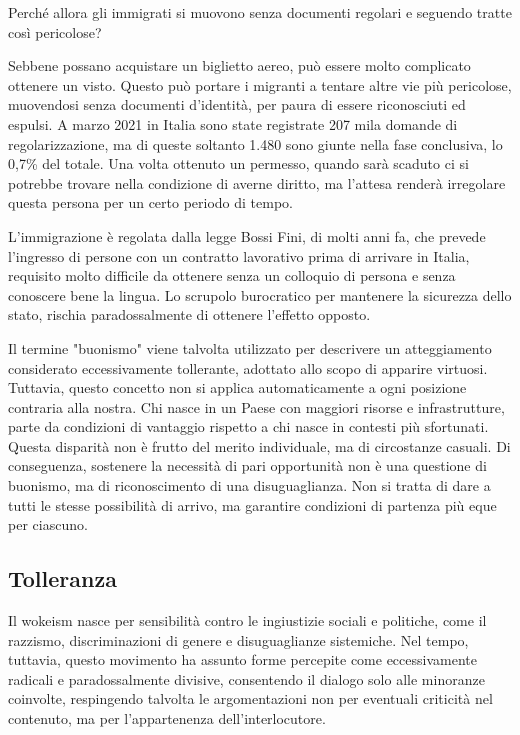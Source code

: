 \documentclass[12pt]{book} %
\begin{document}
Perché allora gli immigrati si muovono senza documenti regolari e seguendo tratte così pericolose? 

Sebbene possano acquistare un biglietto aereo, può essere molto complicato ottenere un visto. Questo può portare i migranti a tentare altre vie più pericolose, muovendosi senza documenti d'identità, per paura di essere riconosciuti ed espulsi. A marzo 2021 in Italia sono state registrate 207 mila domande di regolarizzazione, ma di queste soltanto 1.480 sono giunte nella fase conclusiva, lo 0,7\% del totale. Una volta ottenuto un permesso, quando sarà scaduto ci si potrebbe trovare nella condizione di averne diritto, ma l'attesa renderà irregolare questa persona per un certo periodo di tempo. 

L'immigrazione è regolata dalla legge Bossi Fini, di molti anni fa, che prevede l'ingresso di persone con un contratto lavorativo prima di arrivare in Italia, requisito molto difficile da ottenere senza un colloquio di persona e senza conoscere bene la lingua. 
Lo scrupolo burocratico per mantenere la sicurezza dello stato, rischia paradossalmente di ottenere l'effetto opposto.

\begin{mdframed}[linewidth=1pt]
Il termine "buonismo" viene talvolta utilizzato per descrivere un atteggiamento considerato eccessivamente tollerante, adottato allo scopo di apparire virtuosi. Tuttavia, questo concetto non si applica automaticamente a ogni posizione contraria alla nostra. Chi nasce in un Paese con maggiori risorse e infrastrutture, parte da condizioni di vantaggio rispetto a chi nasce in contesti più sfortunati. Questa disparità non è frutto del merito individuale, ma di circostanze casuali. Di conseguenza, sostenere la necessità di pari opportunità non è una questione di buonismo, ma di riconoscimento di una disuguaglianza. Non si tratta di dare a tutti le stesse possibilità di arrivo, ma garantire condizioni di partenza più eque per ciascuno.
\end{mdframed}

\subsection{Tolleranza}

Il wokeism nasce per sensibilità contro le ingiustizie sociali e politiche, come il razzismo, discriminazioni di genere e disuguaglianze sistemiche. Nel tempo, tuttavia, questo movimento ha assunto forme percepite come eccessivamente radicali e paradossalmente divisive, consentendo il dialogo solo alle minoranze coinvolte, respingendo talvolta le argomentazioni non per eventuali criticità nel contenuto, ma per l'appartenenza dell'interlocutore.
\end{document}
